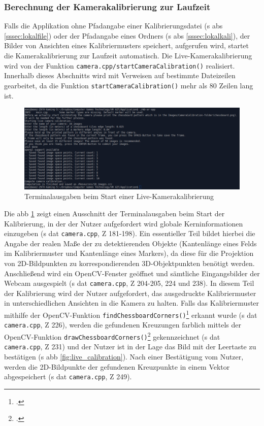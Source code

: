 \subsubsection{Berechnung der Kamerakalibrierung zur Laufzeit}\label{sssec:kaliRuntime}
Falls die Applikation ohne Pfadangabe einer Kalibrierungsdatei (\acs{s} \acs{abs} \ref{sssec:lokalfile}) oder der Pfadangabe eines Ordners (\acs{s} \acs{abs} \ref{sssec:lokalkali}), der Bilder von Ansichten eines Kalibriermusters speichert, aufgerufen wird, startet die Kamerakalibrierung zur Laufzeit automatisch. Die Live-Kamerakalibrierung wird von der Funktion \texttt{camera.cpp/startCameraCalibration()} realisiert. Innerhalb dieses Abschnitts wird mit Verweisen auf bestimmte Dateizeilen gearbeitet, da die Funktion \texttt{startCameraCalibration()} mehr als 80 Zeilen lang ist.

\begin{figure}[H]
\centering
\includegraphics[width=15cm]{Bilder/Implementierung/terminal_logs2.png}
\caption{Terminalausgaben beim Start einer Live-Kamerakalibrierung}
\label{fig:startTerminalkali}
\end{figure}

\noindent Die \acs{abb} \ref{fig:startTerminalkali} zeigt einen Ausschnitt der Terminalausgaben beim Start der Kalibrierung, in der der Nutzer aufgefordert wird globale Kerninformationen einzugeben (\acs{s} \acs{dat} \texttt{camera.cpp}, \acs{Z} 181-198). Ein essentieller Teil bildet hierbei die Angabe der realen Maße der zu detektierenden Objekte (Kantenlänge eines Felds im Kalibriermuster und Kantenlänge eines Markers), da diese für die Projektion von 2D-Bildpunkten zu korrespondierenden 3D-Objektpunkten benötigt werden. Anschließend wird ein OpenCV-Fenster geöffnet und sämtliche Eingangsbilder der Webcam ausgespielt (\acs{s} \acs{dat} \texttt{camera.cpp}, \acs{Z} 204-205, 224 und 238). In diesem Teil der Kalibrierung wird der Nutzer aufgefordert, das ausgedruckte Kalibriermuster in unterschiedlichen Ansichten in die Kamera zu halten. Falls das Kalibriermuster mithilfe der OpenCV-Funktion \texttt{findChessboardCorners()}\footcite{opencvfindChessboardCorners} erkannt wurde (\acs{s} \acs{dat} \texttt{camera.cpp}, \acs{Z} 226), werden die gefundenen Kreuzungen farblich mittels der OpenCV-Funktion \texttt{drawChessboardCorners()}\footcite{opencvdrawChessboardCorners} gekennzeichnet (\acs{s} \acs{dat} \texttt{camera.cpp}, \acs{Z} 231) und der Nutzer ist in der Lage das Bild mit der Leertaste zu bestätigen (\acs{s} \acs{abb} \ref{fig:live_calibration}). Nach einer Bestätigung vom Nutzer, werden die 2D-Bildpunkte der gefundenen Kreuzpunkte in einem Vektor abgespeichert (\acs{s} \acs{dat} \texttt{camera.cpp}, \acs{Z} 249).

